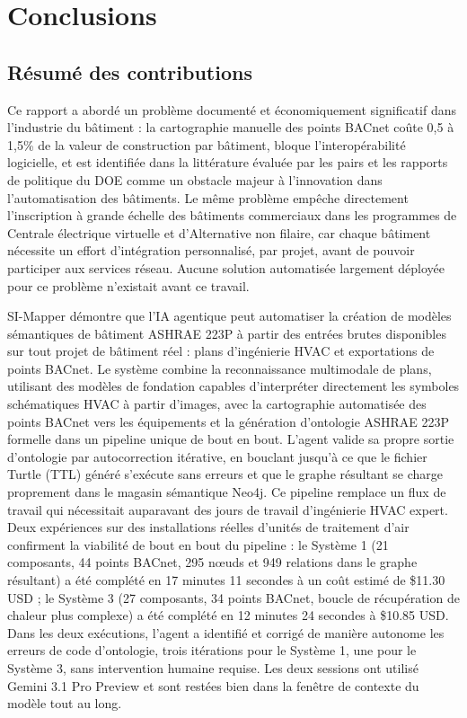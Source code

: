 \section{Conclusions}
\label{sec:conclusions}

\subsection{Résumé des contributions}
\label{subsec:contributions}

Ce rapport a abordé un problème documenté et économiquement significatif dans l'industrie du bâtiment :
la cartographie manuelle des points BACnet coûte 0,5 à 1,5\% de la valeur de construction par bâtiment,
bloque l'interopérabilité logicielle, et est identifiée dans la littérature évaluée par les pairs et les
rapports de politique du DOE comme un obstacle majeur à l'innovation dans l'automatisation des bâtiments.
Le même problème empêche directement l'inscription à grande échelle des bâtiments commerciaux dans les
programmes de Centrale électrique virtuelle et d'Alternative non filaire, car chaque bâtiment nécessite
un effort d'intégration personnalisé, par projet, avant de pouvoir participer aux services réseau.
Aucune solution automatisée largement déployée pour ce problème n'existait avant ce travail.

SI-Mapper démontre que l'IA agentique peut automatiser la création de modèles sémantiques de bâtiment
ASHRAE 223P à partir des entrées brutes disponibles sur tout projet de bâtiment réel : plans d'ingénierie
HVAC et exportations de points BACnet.
Le système combine la reconnaissance multimodale de plans, utilisant des modèles de fondation capables
d'interpréter directement les symboles schématiques HVAC à partir d'images, avec la cartographie
automatisée des points BACnet vers les équipements et la génération d'ontologie ASHRAE 223P formelle dans
un pipeline unique de bout en bout.
L'agent valide sa propre sortie d'ontologie par autocorrection itérative, en bouclant jusqu'à ce que le
fichier Turtle (TTL) généré s'exécute sans erreurs et que le graphe résultant se charge proprement dans
le magasin sémantique Neo4j.
Ce pipeline remplace un flux de travail qui nécessitait auparavant des jours de travail d'ingénierie HVAC
expert.
Deux expériences sur des installations réelles d'unités de traitement d'air confirment la viabilité de
bout en bout du pipeline : le Système 1 (21 composants, 44 points BACnet, 295 nœuds et 949 relations dans
le graphe résultant) a été complété en 17 minutes 11 secondes à un coût estimé de \$11.30 USD ; le
Système 3 (27 composants, 34 points BACnet, boucle de récupération de chaleur plus complexe) a été
complété en 12 minutes 24 secondes à \$10.85 USD.
Dans les deux exécutions, l'agent a identifié et corrigé de manière autonome les erreurs de code
d'ontologie, trois itérations pour le Système 1, une pour le Système 3, sans intervention humaine requise.
Les deux sessions ont utilisé Gemini 3.1 Pro Preview et sont restées bien dans la fenêtre de contexte
du modèle tout au long.

